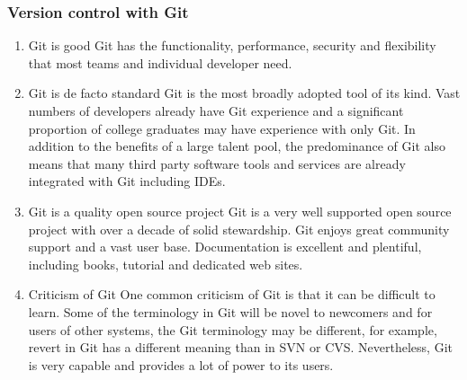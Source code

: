 \documentclass[11pt]{article}
\begin{document}
\subsubsection{Version control with Git}
\label{sec-1-3-4}
\begin{enumerate}
\item Git is good
\label{sec-1-3-4-1}
Git has the functionality, performance, security and flexibility that most teams and individual developer need.

\item Git is de facto standard
\label{sec-1-3-4-2}
Git is the most broadly adopted tool of its kind. Vast numbers of developers already have Git experience and a significant proportion of college graduates may have experience with only Git. In addition to the benefits of a large talent pool, the predominance of Git also means that many third party software tools and services are already integrated with Git including IDEs.

\item Git is a quality open source project
\label{sec-1-3-4-3}
Git is a very well supported open source project with over a decade of solid stewardship. Git enjoys great community support and a vast user base. Documentation is excellent and plentiful, including books, tutorial and dedicated web sites.

\item Criticism of Git
\label{sec-1-3-4-4}
One common criticism of Git is that it can be difficult to learn. Some of the terminology in Git will be novel to newcomers and for users of other systems, the Git terminology may be different, for example, revert in Git has a different meaning than in SVN or CVS. Nevertheless, Git is very capable and provides a lot of power to its users.
\end{enumerate}
\end{document}
